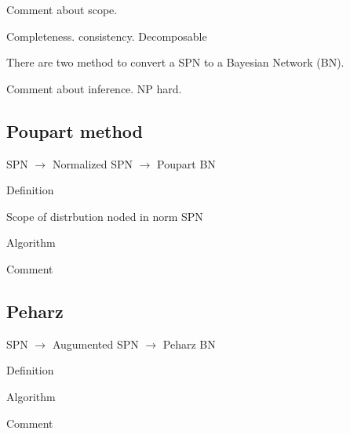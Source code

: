 Comment about scope.



Completeness. consistency. Decomposable


There are two method to convert a SPN to a Bayesian Network (BN)\cite{pear88}.

Comment about inference. NP hard.

\subsection{Poupart method}

SPN $\rightarrow$ Normalized SPN $\rightarrow$ Poupart BN

Definition

Scope of distrbution noded in norm SPN

Algorithm

Comment

\subsection{Peharz}

SPN $\rightarrow$ Augumented SPN $\rightarrow$ Peharz BN

Definition

Algorithm

Comment